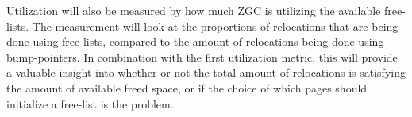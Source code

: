Utilization will also be measured by how much ZGC is utilizing the available free-lists. The measurement will look at the proportions of relocations that are being done using free-lists, compared to the amount of relocations being done using bump-pointers. In combination with the first utilization metric, this will provide a valuable insight into whether or not the total amount of relocations is satisfying the amount of available freed space, or if the choice of which pages should initialize a free-list is the problem. 

